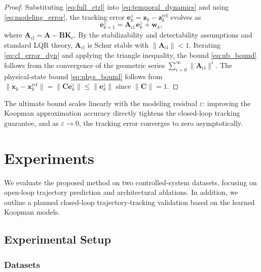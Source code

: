 \documentclass[journal]{IEEEtran}
\newcommand{\vx}{\mathbf{x}}
\newcommand{\vz}{\mathbf{z}}
\newcommand{\vw}{\mathbf{w}}
\newcommand{\ve}{\mathbf{e}}
\newcommand{\mA}{\mathbf{A}}
\newcommand{\mB}{\mathbf{B}}
\newcommand{\mC}{\mathbf{C}}
\newcommand{\mK}{\mathbf{K}}
\begin{document}
\begin{proof}
Substituting \eqref{eq:full_ctrl} into \eqref{eq:temporal_dynamics} and using \eqref{eq:modeling_error}, the tracking error $\ve_k^z = \vz_k - \vz_k^{\mathrm{ref}}$ evolves as
\begin{equation}
    \ve_{k+1}^z = \mA_{\mathrm{cl}}\, \ve_k^z + \vw_k,
    \label{eq:cl_error_dyn}
\end{equation}
where $\mA_{\mathrm{cl}} = \mA - \mB\mK_c$. By the stabilizability and detectability assumptions and standard LQR theory, $\mA_{\mathrm{cl}}$ is Schur stable with $\|\mA_{\mathrm{cl}}\| < 1$. Iterating \eqref{eq:cl_error_dyn} and applying the triangle inequality, the bound \eqref{eq:ub_bound} follows from the convergence of the geometric series $\sum_{i=0}^{\infty}\|\mA_{\mathrm{cl}}\|^i$. The physical-state bound \eqref{eq:phys_bound} follows from $\|\vx_k - \vx_k^{\mathrm{ref}}\| = \|\mC\ve_k^z\| \leq \|\ve_k^z\|$ since $\|\mC\| = 1$.
\end{proof}

The ultimate bound scales linearly with the modeling residual $\varepsilon$: improving the Koopman approximation accuracy directly tightens the closed-loop tracking guarantee, and as $\varepsilon \to 0$, the tracking error converges to zero asymptotically.

\section{Experiments}
\label{sec:experiments}

We evaluate the proposed method on two controlled-system datasets, focusing on open-loop trajectory prediction and architectural ablations. In addition, we outline a planned closed-loop trajectory-tracking validation based on the learned Koopman models.

\subsection{Experimental Setup}

\subsubsection{Datasets}
\end{document}
